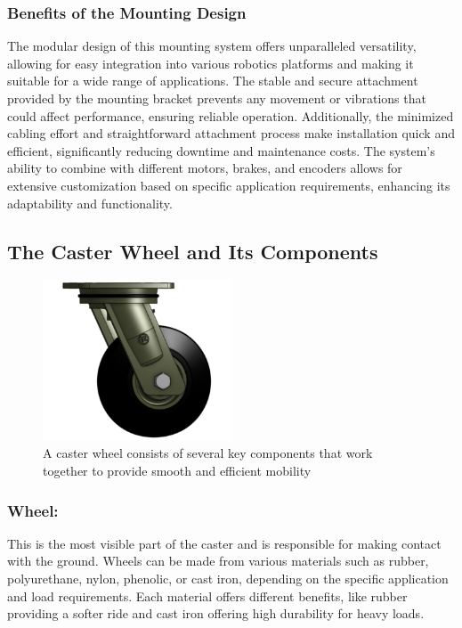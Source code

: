 \documentclass[../../main]{subfiles}
\begin{document}
\subsubsection{Benefits of the Mounting Design}
The modular design of this mounting system offers unparalleled versatility, allowing for easy integration into various robotics platforms and making it suitable for a wide range of applications. The stable and secure attachment provided by the mounting bracket prevents any movement or vibrations that could affect performance, ensuring reliable operation. Additionally, the minimized cabling effort and straightforward attachment process make installation quick and efficient, significantly reducing downtime and maintenance costs. The system's ability to combine with different motors, brakes, and encoders allows for extensive customization based on specific application requirements, enhancing its adaptability and functionality.

\subsection{The Caster Wheel and Its Components}

\begin{figure}[h!]
  \centering
  \includegraphics[width=0.5\textwidth]{img/caster.png}
  \caption[Key Components of a Caster Wheel]{A caster wheel consists of several key components that work together to provide smooth and efficient mobility}

  \end{figure}

\subsubsection{Wheel:}
This is the most visible part of the caster and is responsible for making contact with the ground. Wheels can be made from various materials such as rubber, polyurethane, nylon, phenolic, or cast iron, depending on the specific application and load requirements. Each material offers different benefits, like rubber providing a softer ride and cast iron offering high durability for heavy loads.
\end{document}

